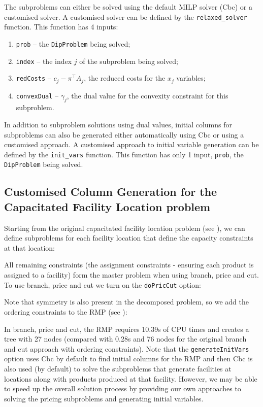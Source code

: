 The subproblems can either be solved using the default \ac{MILP} solver (Cbc) or a customised solver. A customised solver can be defined by the \texttt{relaxed\_solver} function. This function has 4 inputs:
\begin{enumerate}
\item \texttt{prob} -- the \texttt{DipProblem} being solved;
\item \texttt{index} -- the index $j$ of the subproblem being solved;
\item \texttt{redCosts} -- $c_j - \pi^\top A_j$, the reduced costs for the $x_j$ variables;
\item \texttt{convexDual} -- $\gamma_j$, the dual value for the convexity constraint for this subproblem.
\end{enumerate}
In addition to subproblem solutions using dual values, initial columns for subproblems can also be generated either automatically using Cbc or using a customised approach. A customised approach to initial variable generation can be defined by the \texttt{init\_vars} function. This function has only 1 input, \texttt{prob}, the \texttt{DipProblem} being solved.

\subsection{Customised Column Generation for the Capacitated Facility Location problem} \label{sbs:fac_cols}

Starting from the original capacitated facility location problem (see ), we can define subproblems for each facility location that define the capacity constraints at that location:


All remaining constraints (the assignment constraints - ensuring each product is assigned to a facility) form the master problem when using branch, price and cut. To use branch, price and cut we turn on the \texttt{doPricCut} option:


Note that symmetry is also present in the decomposed problem, so we add the ordering constraints to the RMP (see ):


In branch, price and cut, the RMP requires 10.39s of CPU times and creates a tree with 27 nodes (compared with 0.28s and 76 nodes for the original branch and cut approach with ordering constraints). Note that the \texttt{generateInitVars} option uses Cbc by default to find initial columns for the RMP and then Cbc is also used (by default) to solve the subproblems that generate facilities at locations along with products produced at that facility. However, we may be able to speed up the overall solution process by providing our own approaches to solving the pricing subproblems and generating initial variables.

